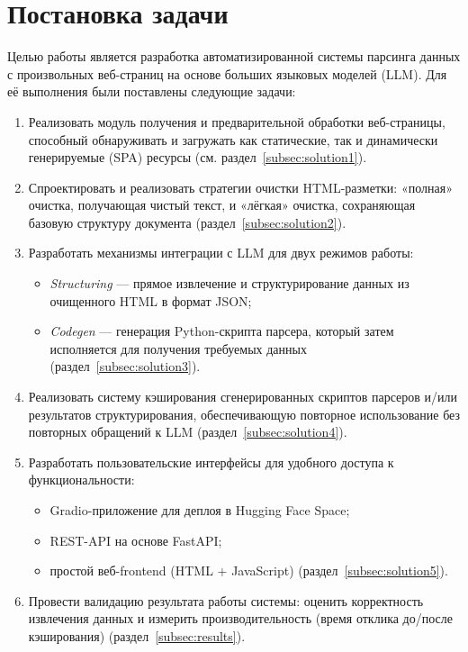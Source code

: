 
\section{Постановка задачи}
\label{sec:task}

Целью работы является разработка автоматизированной системы парсинга данных с произвольных веб-страниц на основе больших языковых моделей (LLM). Для её выполнения были поставлены следующие задачи:
\begin{enumerate}
    \item Реализовать модуль получения и предварительной обработки веб-страницы, способный обнаруживать и загружать как статические, так и динамически генерируемые (SPA) ресурсы (см. раздел~\ref{subsec:solution1}).
    \item Спроектировать и реализовать стратегии очистки HTML-разметки: «полная» очистка, получающая чистый текст, и «лёгкая» очистка, сохраняющая базовую структуру документа (раздел~\ref{subsec:solution2}).
    \item Разработать механизмы интеграции с LLM для двух режимов работы:
    \begin{itemize}
        \item \emph{Structuring} — прямое извлечение и структурирование данных из очищенного HTML в формат JSON;
        \item \emph{Codegen} — генерация Python-скрипта парсера, который затем исполняется для получения требуемых данных (раздел~\ref{subsec:solution3}).
    \end{itemize}
    \item Реализовать систему кэширования сгенерированных скриптов парсеров и/или результатов структурирования, обеспечивающую повторное использование без повторных обращений к LLM (раздел~\ref{subsec:solution4}).
    \item Разработать пользовательские интерфейсы для удобного доступа к функциональности:
    \begin{itemize}
        \item Gradio-приложение для деплоя в Hugging Face Space;
        \item REST-API на основе FastAPI;
        \item простой веб-frontend (HTML + JavaScript) (раздел~\ref{subsec:solution5}).
    \end{itemize}
    \item Провести валидацию результата работы системы: оценить корректность извлечения данных и измерить производительность (время отклика до/после кэширования) (раздел~\ref{subsec:results}).
\end{enumerate}
